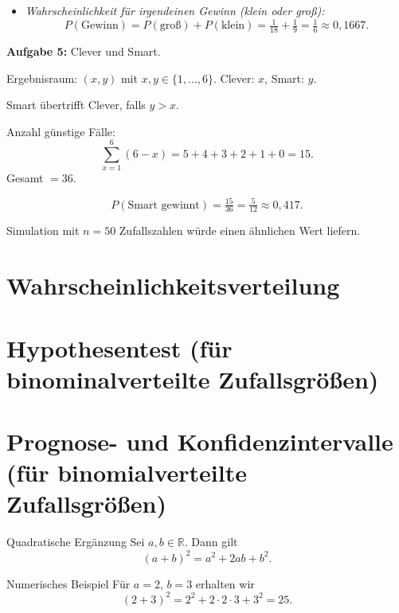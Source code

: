 \documentclass[11pt,a4paper,oneside]{article}
\begin{document}
\begin{loesung}
\begin{enumerate}
\begin{itemize}
				\item \emph{Wahrscheinlichkeit für irgendeinen Gewinn (klein oder groß):}  
				\[
				P(\text{Gewinn}) = P(\text{groß})+P(\text{klein})=\tfrac{1}{18}+\tfrac{1}{9}=\tfrac{1}{6}\approx 0{,}1667.
				\]
			\end{itemize}
			
		\end{enumerate}
		
		\vspace{1cm}
		
		\textbf{Aufgabe 5:} Clever und Smart.  
		
		Ergebnisraum: $(x,y)$ mit $x,y \in \{1,\dots,6\}$.  
		Clever: $x$, Smart: $y$.  
		
		Smart übertrifft Clever, falls $y>x$.  
		
		Anzahl günstige Fälle:  
		\[
		\sum_{x=1}^6 (6-x) = 5+4+3+2+1+0 = 15.
		\]  
		Gesamt $=36$.  
		
		\[
		P(\text{Smart gewinnt}) = \tfrac{15}{36} = \tfrac{5}{12} \approx 0{,}417.
		\]
		
		Simulation mit $n=50$ Zufallszahlen würde einen ähnlichen Wert liefern.  
		
	\end{loesung}
	
	
	\section{Wahrscheinlichkeitsverteilung}
	
	\section{Hypothesentest (für binominalverteilte Zufallsgrößen)}
	
	\section{Prognose- und Konfidenzintervalle (für binomialverteilte Zufallsgrößen)}
	
	\newpage
	
	
	\begin{theo}{Quadratische Ergänzung}
		Sei \(a,b\in \mathbb{R}\). Dann gilt
		\[
		(a+b)^2 = a^2 + 2ab + b^2.
		\]
	\end{theo}
	
	\begin{exem}{Numerisches Beispiel}
		Für \(a=2\), \(b=3\) erhalten wir
		\[
		(2+3)^2 = 2^2 + 2\cdot 2\cdot 3 + 3^2 = 25.
		\]
	\end{exem}
	
\end{document}
